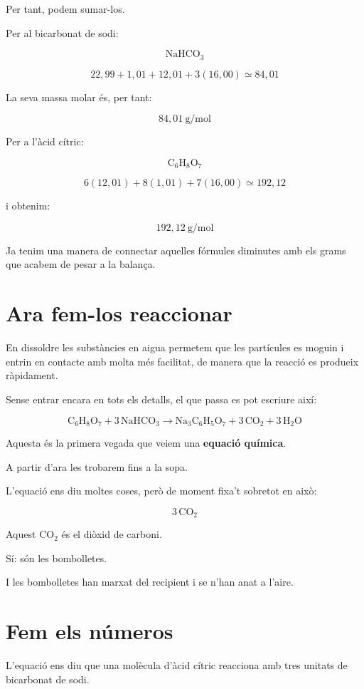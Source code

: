 Per tant, podem sumar-los.

Per al bicarbonat de sodi:

\[
\mathrm{NaHCO_3}
\]

\[
22,99 + 1,01 + 12,01 + 3(16,00)
\simeq 84,01
\]

La seva massa molar és, per tant:

\[
84,01\ \text{g/mol}
\]

Per a l'àcid cítric:

\[
\mathrm{C_6H_8O_7}
\]

\[
6(12,01)+8(1,01)+7(16,00)
\simeq 192,12
\]

i obtenim:

\[
192,12\ \text{g/mol}
\]

Ja tenim una manera de connectar aquelles fórmules diminutes amb els grams que acabem de pesar a la balança.

\section{Ara fem-los reaccionar}

En dissoldre les substàncies en aigua permetem que les partícules es moguin i entrin en contacte amb molta més facilitat, de manera que la reacció es produeix ràpidament.

Sense entrar encara en tots els detalls, el que passa es pot escriure així:

\[
\mathrm{C_6H_8O_7
+3\,NaHCO_3
\longrightarrow
Na_3C_6H_5O_7
+3\,CO_2
+3\,H_2O}
\]

Aquesta és la primera vegada que veiem una \textbf{equació química}.

A partir d'ara les trobarem fins a la sopa.

L'equació ens diu moltes coses, però de moment fixa't sobretot en això:

\[
\mathrm{3\,CO_2}
\]

Aquest \(\mathrm{CO_2}\) és el diòxid de carboni.

Sí: són les bombolletes.

I les bombolletes han marxat del recipient i se n'han anat a l'aire.

\section{Fem els números}

L'equació ens diu que una molècula d'àcid cítric reacciona amb tres unitats de bicarbonat de sodi.

